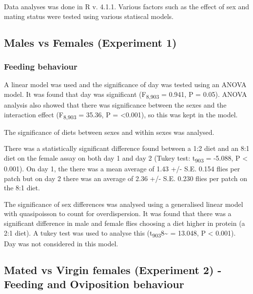 \documentclass[
]{article}
\author{}
\date{\vspace{-2.5em}}
\begin{document}
Data analyses was done in R v. 4.1.1. Various factors such as the effect
of sex and mating status were tested using various statiscal models.

\hypertarget{males-vs-females-experiment-1}{%
\subsection{Males vs Females (Experiment
1)}\label{males-vs-females-experiment-1}}

\hypertarget{feeding-behaviour}{%
\subsubsection{Feeding behaviour}\label{feeding-behaviour}}

A linear model was used and the significance of day was tested using an
ANOVA model. It was found that day was significant
(F\textsubscript{8,903} = 0.941, P = 0.05). ANOVA analysis also showed
that there was significance between the sexes and the interaction effect
(F\textsubscript{8,903} = 35.36, P = \textless0.001), so this was kept
in the model.

The significance of diets between sexes and within sexes was analysed.

There was a statistically significant difference found between a 1:2
diet and an 8:1 diet on the female assay on both day 1 and day 2 (Tukey
test: t\textsubscript{903} = -5.088, P \textless{} 0.001). On day 1, the
there was a mean average of 1.43 +/- S.E. 0.154 flies per patch but on
day 2 there was an average of 2.36 +/- S.E. 0.230 flies per patch on the
8:1 diet.

The significance of sex differences was analysed using a generalised
linear model with quasipoisson to count for overdispersion. It was found
that there was a significant difference in male and female flies
choosing a diet higher in protein (a 2:1 diet). A tukey test was used to
analyse this (t\textsubscript{903}8\textasciitilde{} = 13.048, P
\textless{} 0.001). Day was not considered in this model.

\hypertarget{mated-vs-virgin-females-experiment-2---feeding-and-oviposition-behaviour}{%
\subsection{Mated vs Virgin females (Experiment 2) - Feeding and
Oviposition
behaviour}\label{mated-vs-virgin-females-experiment-2---feeding-and-oviposition-behaviour}}
\end{document}
